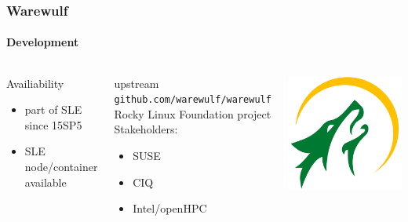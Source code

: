 \documentclass[aspectratio=169]{beamer}
\begin{document}
\begin{frame}[fragile]
\frametitle{Warewulf}
\framesubtitle{Development}
\begin{columns}
\begin{block}{Availiability}
  \begin{itemize}
    \item part of SLE since 15SP5
    \item SLE node/container available
  \end{itemize}
\end{block}
\begin{block}{upstream}
\texttt{github.com/warewulf/warewulf} \\
Rocky Linux Foundation project\\
Stakeholders:
\begin{itemize}
  \item SUSE
  \item CIQ
  \item Intel/openHPC
\end{itemize}
\end{block}
\includegraphics[width=.8\linewidth]{warewulf-logo}
\end{columns}
\end{frame}
\end{document}
